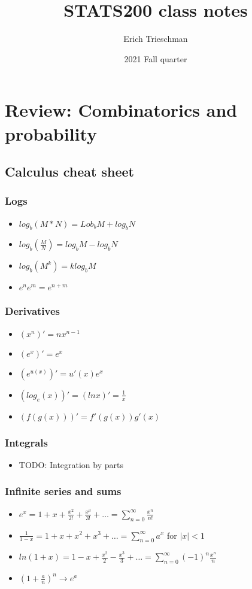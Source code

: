 \documentclass{article}
\title{STATS200 class notes}
\author{Erich Trieschman}
\date{2021 Fall quarter}
\newcommand{\abs}[1]{\lvert#1\rvert}
\begin{document}
\maketitle

\tableofcontents

\section{Review: Combinatorics and probability}
\subsection{Calculus cheat sheet}
\subsubsection{Logs}
\begin{itemize}
	\item $log_b(M * N) = Lob_bM + log_bN$
	\item $log_b(\frac{M}{N}) = log_bM - log_bN$
	\item $log_b(M^k) = klog_bM$
	\item $e^ne^m = e^{n+m}$
\end{itemize}
\subsubsection{Derivatives}
\begin{itemize}
	\item $(x^n)' = nx^{n-1}$
	\item $(e^x)' = e^x$
	\item $(e^{u(x)})' = u'(x)e^x$
	\item $(log_e(x))' = (lnx)' = \frac{1}{x}$
	\item $(f(g(x)))' = f'(g(x))g'(x)$
\end{itemize}
\subsubsection{Integrals}
\begin{itemize}
	\item TODO: Integration by parts
\end{itemize}
\subsubsection{Infinite series and sums}
\begin{itemize}
	\item $e^x = 1 + x + \frac{x^2}{2!} + \frac{x^3}{3!} + \dots = \sum_{n=0}^\infty \frac{x^n}{n!}$
	\item $\frac{1}{1-x} = 1 + x + x^2 + x^3 + \dots = \sum_{n=0}^\infty a^x$ for $\abs{x} < 1$
	\item $ln(1 + x) = 1 - x + \frac{x^2}{2} - \frac{x^3}{3} + \dots = \sum_{n=0}^\infty (-1)^n\frac{x^n}{n}$
	\item $(1 + \frac{a}{n})^n \longrightarrow e^a$
\end{itemize}
\end{document}

